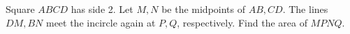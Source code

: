 Square $ABCD$ has side 2. Let $M,N$ be the midpoints of $AB,CD$. The lines $DM,BN$ meet the incircle again at $P,Q$, respectively. Find the area of $MPNQ$.
